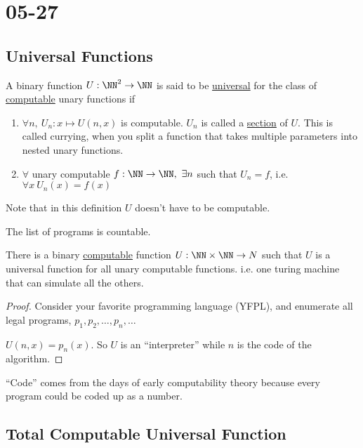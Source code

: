 \documentclass[../598comp.tex]{subfiles}
\date{05-27}
\begin{document}
\section{05-27}

\subsection{Universal Functions}

\begin{definition}
  A binary function $U: \NN^2 \to \NN$ is said to be \ul{universal} for the
  class of \ul{computable} unary functions if
  \begin{enumerate}
  \item 
    $\forall n, \ U_n: x \mapsto U(n, x)$ is computable. $U_n$ is called a
    \ul{section} of $U$. This is called currying, when you split a function that
    takes multiple parameters into nested unary functions.
  \item
    $\forall$ unary computable $f: \NN \to \NN, \ \exists n$ such that $U_n =
    f$, i.e. $\forall x \ U_n(x) = f(x)$
  \end{enumerate}
  Note that in this definition $U$ doesn't have to be computable.
\end{definition}

\begin{note}
  The list of programs is countable.
\end{note}

\begin{theorem}
  There is a binary \ul{computable} function $U: \NN \times \NN \to N$ such that
  $U$ is a universal function for all unary computable functions. i.e. one
  turing machine that can simulate all the others.
  \begin{proof}
    Consider your favorite programming language (YFPL), and enumerate all legal
    programs, $p_1, p_2, \dots, p_n, \dots$

    $U(n, x) = p_n(x)$. So $U$ is an ``interpreter'' while $n$ is the code of
    the algorithm.
  \end{proof}
  \begin{note}
    ``Code'' comes from the days of early computability theory because every
    program could be coded up as a number.
  \end{note}
\end{theorem}

\subsection{Total Computable Universal Function}
\end{document}
